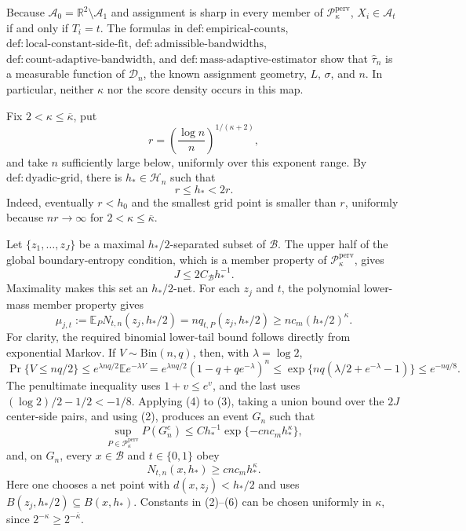 Because \(\mathcal A_0=\mathbb R^2\setminus\mathcal A_1\) and assignment is sharp in every member of \(\mathcal P_{\kappa}^{\mathrm{perv}}\), \(X_i\in\mathcal A_t\) if and only if \(T_i=t\). The formulas in \(\mathrm{def:empirical\text{-}counts}\), \(\mathrm{def:local\text{-}constant\text{-}side\text{-}fit}\), \(\mathrm{def:admissible\text{-}bandwidths}\), \(\mathrm{def:count\text{-}adaptive\text{-}bandwidth}\), and \(\mathrm{def:mass\text{-}adaptive\text{-}estimator}\) show that \(\widehat\tau_n\) is a measurable function of \(\mathcal D_n\), the known assignment geometry, \(L\), \(\sigma\), and \(n\). In particular, neither \(\kappa\) nor the score density occurs in this map.

Fix \(2<\kappa\le\overline\kappa\), put
\[
r=\left(\frac{\log n}{n}\right)^{1/(\kappa+2)},
\]
and take \(n\) sufficiently large below, uniformly over this exponent range. By \(\mathrm{def:dyadic\text{-}grid}\), there is \(h_*\in\mathcal H_n\) such that
\[
r\le h_*<2r. \tag{1}
\]
Indeed, eventually \(r<h_0\) and the smallest grid point is smaller than \(r\), uniformly because \(nr\to\infty\) for \(2<\kappa\le\overline\kappa\).

Let \(\{z_1,\ldots,z_J\}\) be a maximal \(h_*/2\)-separated subset of \(\mathcal B\). The upper half of the global boundary-entropy condition, which is a member property of \(\mathcal P_{\kappa}^{\mathrm{perv}}\), gives
\[
J\le 2C_{\mathcal B}h_*^{-1}. \tag{2}
\]
Maximality makes this set an \(h_*/2\)-net. For each \(z_j\) and \(t\), the polynomial lower-mass member property gives
\[
\mu_{j,t}:=\mathbb E_P N_{t,n}(z_j,h_*/2)
=nq_{t,P}(z_j,h_*/2)
\ge nc_m(h_*/2)^{\kappa}. \tag{3}
\]
For clarity, the required binomial lower-tail bound follows directly from exponential Markov. If \(V\sim\mathrm{Bin}(n,q)\), then, with \(\lambda=\log2\),
\[
\Pr\{V\le nq/2\}
\le e^{\lambda nq/2}\mathbb E e^{-\lambda V}
=e^{\lambda nq/2}(1-q+qe^{-\lambda})^n
\le\exp\{nq(\lambda/2+e^{-\lambda}-1)\}
\le e^{-nq/8}. \tag{4}
\]
The penultimate inequality uses \(1+v\le e^v\), and the last uses \((\log2)/2-1/2<-1/8\). Applying (4) to (3), taking a union bound over the \(2J\) center-side pairs, and using (2), produces an event \(G_n\) such that
\[
\sup_{P\in\mathcal P_{\kappa}^{\mathrm{perv}}}P(G_n^c)
\le Ch_*^{-1}\exp\{-cnc_mh_*^{\kappa}\}, \tag{5}
\]
and, on \(G_n\), every \(x\in\mathcal B\) and \(t\in\{0,1\}\) obey
\[
N_{t,n}(x,h_*)\ge cnc_mh_*^{\kappa}. \tag{6}
\]
Here one chooses a net point with \(d(x,z_j)<h_*/2\) and uses
\(B(z_j,h_*/2)\subseteq B(x,h_*)\). Constants in (2)--(6) can be chosen uniformly in \(\kappa\), since \(2^{-\kappa}\ge2^{-\overline\kappa}\).

